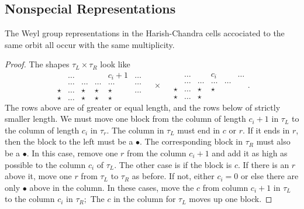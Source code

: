 \documentclass[11pt ,reqno]{amsart}
\begin{document}
\subsection{Nonspecial Representations}
\begin{proposition}[hccells]
  \label{p:hc}
The Weyl group representations in the Harish-Chandra  cells accociated
to the same orbit all occur with  the same multiplicity. 
\end{proposition}
\begin{proof}
The shapes $\tau_L\times\tau_R$ look like
$$
\begin{matrix}
  &\dots &&&c_i+1&\dots\\
  &\dots &\dots&\dots&\dots&\dots\\
  \star&\dots &\star&\star&\star&\dots\\
  \star&\dots &\star&\star&\star
\end{matrix}
\quad\times\quad
\begin{matrix}
  &\dots     &&c_i&&\dots\\
  &\dots &\dots&\dots&\dots&\\
  \star&\dots &\star&\star&\\
  \star&\dots &\star&
\end{matrix}.
$$
The rows above are of greater or
equal length, and the rows below of strictly smaller
length. We must move one block from the column of length $c_i+1$ in $\tau_L$ to the column of length $c_i$ in $\tau_r.$ The column in $\tau_L$ must end in $c$ or $r.$ If it ends in $r$, then the block to the left must be a $\bullet$. The corresponding block in $\tau_R$ must also be a $\bullet.$ In this case, remove one $r$ from the column $c_i+1$ and add it as high as possible to the column $c_i$ of $\tau_L.$ The other case is if the block is $c.$ If there is an $r$ above it, move one $r$ from $\tau_L$ to $\tau_R$ as before. If not, either $c_i=0$ or else there are only $\bullet$ above in the column. In these cases, move the $c$ from column $c_i+1$ in $\tau_L$ to the column $c_i$ in $\tau_R;$ The $c$ in the column for $\tau_L$ moves up one block.


\end{proof}
\end{document}
